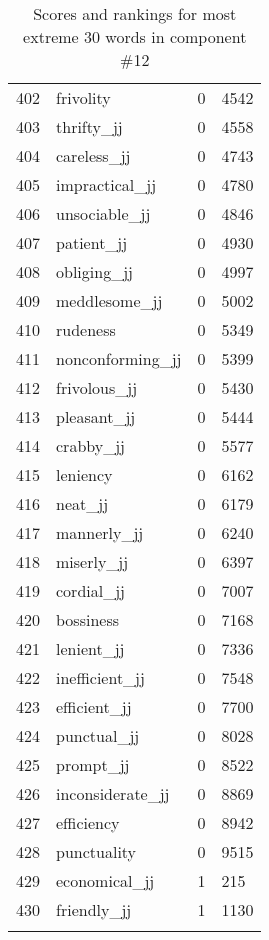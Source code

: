 \begin{longtable}[!htbp]{| rlr@{.}l |}
    402 & frivolity & 0 & 4542 \\
    403 & thrifty\_jj & 0 & 4558 \\
    404 & careless\_jj & 0 & 4743 \\
    405 & impractical\_jj & 0 & 4780 \\
    406 & unsociable\_jj & 0 & 4846 \\
    407 & patient\_jj & 0 & 4930 \\
    408 & obliging\_jj & 0 & 4997 \\
    409 & meddlesome\_jj & 0 & 5002 \\
    410 & rudeness & 0 & 5349 \\
    411 & nonconforming\_jj & 0 & 5399 \\
    412 & frivolous\_jj & 0 & 5430 \\
    413 & pleasant\_jj & 0 & 5444 \\
    414 & crabby\_jj & 0 & 5577 \\
    415 & leniency & 0 & 6162 \\
    416 & neat\_jj & 0 & 6179 \\
    417 & mannerly\_jj & 0 & 6240 \\
    418 & miserly\_jj & 0 & 6397 \\
    419 & cordial\_jj & 0 & 7007 \\
    420 & bossiness & 0 & 7168 \\
    421 & lenient\_jj & 0 & 7336 \\
    422 & inefficient\_jj & 0 & 7548 \\
    423 & efficient\_jj & 0 & 7700 \\
    424 & punctual\_jj & 0 & 8028 \\
    425 & prompt\_jj & 0 & 8522 \\
    426 & inconsiderate\_jj & 0 & 8869 \\
    427 & efficiency & 0 & 8942 \\
    428 & punctuality & 0 & 9515 \\
    429 & economical\_jj & 1 & 215 \\
    430 & friendly\_jj & 1 & 1130 \\
    \hline
    \caption{Scores and rankings for most extreme 30 words in component \#12} \\
\end{longtable}
